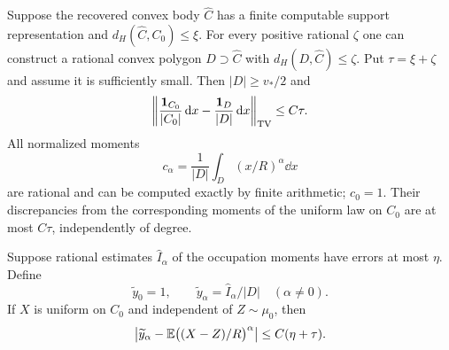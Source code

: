 \begin{lemma}
\label{lem:moment-rational-factor}
Suppose the recovered convex body $\widehat C$ has a finite
computable support representation and
$d_H(\widehat C,C_0)\le\xi$.  For every positive rational $\zeta$
one can construct a rational convex polygon $D\supset\widehat C$
with $d_H(D,\widehat C)\le\zeta$.  Put $\tau=\xi+\zeta$ and assume
it is sufficiently small.  Then $|D|\ge v_*/2$ and
\begin{equation}\label{eq:moment-factor-TV}
 \left\|\frac{\mathbf 1_{C_0}}{|C_0|}\,\mathrm d x
              -\frac{\mathbf 1_D}{|D|}\,\mathrm d x\right\|_{\rm TV}
       \le C\tau.
\end{equation}
All normalized moments
\begin{equation}\label{eq:moment-rational-factor-moments}
 c_\alpha=\frac1{|D|}\int_D(x/R)^\alpha\dd x
\end{equation}
are rational and can be computed exactly by finite arithmetic;
$c_0=1$.  Their discrepancies from the corresponding moments of
the uniform law on $C_0$ are at most $C\tau$, independently of
degree.

Suppose rational estimates $\widehat I_\alpha$ of the occupation
moments have errors at most $\eta$.  Define
\begin{equation}\label{eq:moment-rational-data}
 \widetilde y_0=1,\qquad
 \widetilde y_\alpha=\widehat I_\alpha/|D|
                              \quad(\alpha\ne0).
\end{equation}
If $X$ is uniform on $C_0$ and independent of $Z\sim\mu_0$, then
\begin{equation}\label{eq:moment-normalization-error}
 \left|\widetilde y_\alpha-
                   \mathbb E\bigl((X-Z)/R\bigr)^\alpha\right|
       \le C(\eta+\tau).
\end{equation}
\end{lemma}
